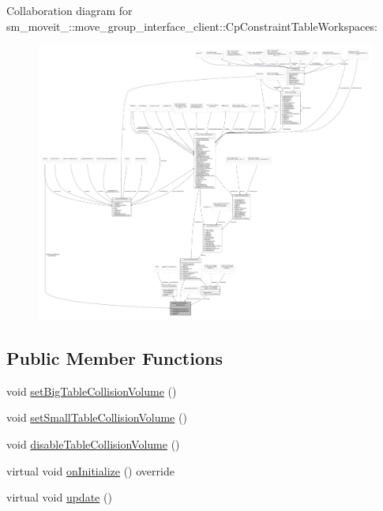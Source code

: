 Collaboration diagram for sm\+\_\+moveit\+\_\+:\+:move\+\_\+group\+\_\+interface\+\_\+client\+:\+:Cp\+Constraint\+Table\+Workspaces\+:
\nopagebreak
\begin{figure}[H]
\begin{center}
\leavevmode
\includegraphics[width=350pt]{classsm__moveit__4_1_1move__group__interface__client_1_1CpConstraintTableWorkspaces__coll__graph}
\end{center}
\end{figure}
\subsection*{Public Member Functions}
\begin{DoxyCompactItemize}
\item 
void \hyperlink{classsm__moveit__4_1_1move__group__interface__client_1_1CpConstraintTableWorkspaces_a6f957ed21a9ea01327d3c7c4ebbebe81}{set\+Big\+Table\+Collision\+Volume} ()
\item 
void \hyperlink{classsm__moveit__4_1_1move__group__interface__client_1_1CpConstraintTableWorkspaces_a0d343583b5ea3e9bc9df4779fe85d805}{set\+Small\+Table\+Collision\+Volume} ()
\item 
void \hyperlink{classsm__moveit__4_1_1move__group__interface__client_1_1CpConstraintTableWorkspaces_abc1d95f8b46629dc7caa0d7b5be0a7b9}{disable\+Table\+Collision\+Volume} ()
\item 
virtual void \hyperlink{classsm__moveit__4_1_1move__group__interface__client_1_1CpConstraintTableWorkspaces_a0c9f51a8752aac05a6d2f1e00d06a34e}{on\+Initialize} () override
\item 
virtual void \hyperlink{classsm__moveit__4_1_1move__group__interface__client_1_1CpConstraintTableWorkspaces_a7d7ed0c25f8d40392a977160ae3123a7}{update} ()
\end{DoxyCompactItemize}
